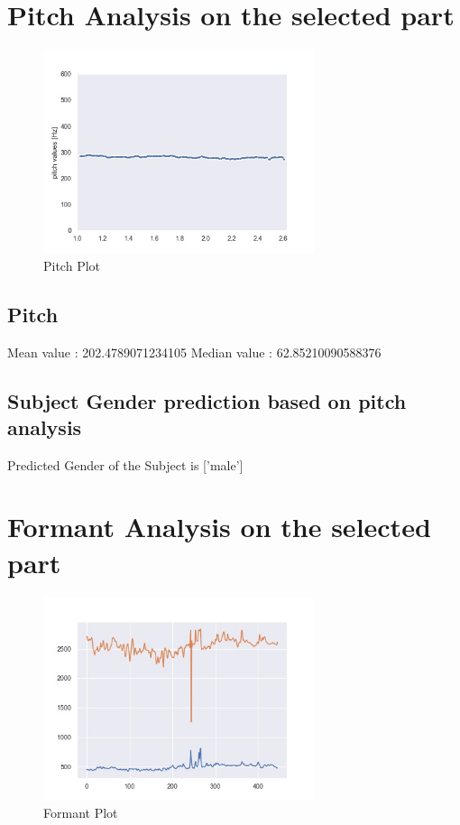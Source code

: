 \documentclass{article}%
\begin{document}
%
\pagebreak[4]

%
\section{Pitch Analysis on the selected part}%
\label{sec:PitchAnalysisontheselectedpart}%


\begin{figure}[h!]%
\centering%
\includegraphics[width=300px]{pitch.jpg}%
\caption{Pitch Plot}%
\end{figure}

%
\subsection{Pitch}%
\label{subsec:Pitch}%
Mean value : 202.4789071234105%
\newline%
Median value : 62.85210090588376

%
\subsection{Subject Gender prediction based on pitch analysis}%
\label{subsec:SubjectGenderpredictionbasedonpitchanalysis}%
Predicted Gender of the Subject is {[}'male'{]}

%
\pagebreak[4]

%
\section{Formant Analysis on the selected part}%
\label{sec:FormantAnalysisontheselectedpart}%


\begin{figure}[h!]%
\centering%
\includegraphics[width=300px]{formant.jpg}%
\caption{Formant Plot}%
\end{figure}
\end{document}
